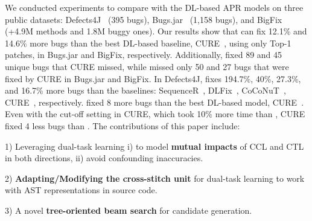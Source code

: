 We conducted experiments to compare {\tool} with the DL-based APR
models on three public datasets: Defects4J~\cite{defects4j} (395
bugs), Bugs.jar~\cite{saha2018bugs} (1,158 bugs), and
BigFix~\cite{yioopsla19} (+4.9M methods and 1.8M buggy ones). Our
results show that {\tool} can fix 12.1\% and 14.6\% more bugs than the
best DL-based baseline, CURE~\cite{cure-icse21}, using only Top-1
patches, in Bugs.jar and BigFix, respectively. Additionally, {\tool}
fixed 89 and 45 unique bugs that CURE missed, while {\tool} missed
only 50 and 27 bugs that were fixed by CURE in Bugs.jar and BigFix. In
Defects4J, {\tool} fixes 194.7\%, 40\%, 27.3\%, and 16.7\% more bugs
than the baselines: SequenceR~\cite{chen2018sequencer},
DLFix~\cite{icse20}, CoCoNuT~\cite{lutellier2020coconut},
CURE~\cite{cure-icse21}, respectively. {\tool} fixed 8 more bugs than the
best DL-based model, CURE~\cite{cure-icse21}. Even with the cut-off
setting in CURE, which took 10\% more time than {\tool}, CURE fixed 4
less bugs than {\tool}. The contributions of this paper include:




1) Leveraging dual-task learning i) to model {\bf mutual impacts}
of CCL and CTL in both directions, ii) avoid confounding inaccuracies.



2) {\bf Adapting/Modifying the cross-stitch unit} for dual-task
learning to work with AST representations in source code.

3) A novel {\bf tree-oriented beam search} for candidate generation.




